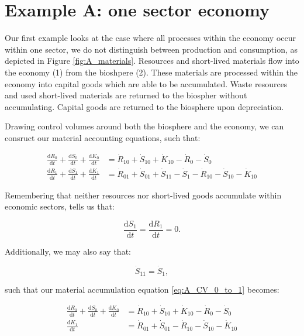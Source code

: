 \section{Example A: one sector economy}
\label{sec:A_materials}


Our first example looks at the case where all processes within the economy occur within
one sector, we do not distinguish between production and consumption, as depicted in
Figure \ref{fig:A_materials}. Resources and short-lived materials flow into the economy (1) from the bioshpere (2). These materials are processed within the economy into
capital goods which are able to be accumulated. Waste resources and used short-lived
materials are returned to the biospher without accumulating. Capital goods are returned
to the biosphere upon depreciation.

Drawing control volumes around both the biosphere and the economy, we can consruct
our material accounting equations, such that:

\begin{align}\label{eq:A_CV_0_to_1}
	\frac{\mathrm{d}R_0}{\mathrm{d}t}		
	+	\frac{\mathrm{d}S_0}{\mathrm{d}t}
	+	\frac{\mathrm{d}K_0}{\mathrm{d}t}		&	
	=	\dot{R}_{10}		
	+	\dot{S}_{10}	
	+	\dot{K}_{10}											
	-	\dot{R}_{0}											
	-	\dot{S}_{0}								\\
	\frac{\mathrm{d}R_{1}}{\mathrm{d}t}
	+ \frac{\mathrm{d}S_{1}}{\mathrm{d}t}
	+ \frac{\mathrm{d}K_{1}}{\mathrm{d}t}		&
	= \dot{R}_{01} 
	+ \dot{S}_{01} + \dot{S}_{11}
	- \dot{S}_{1}				
	- \dot{R}_{10}				
	- \dot{S}_{10}				
	- \dot{K}_{10}											
\end{align}

\noindent Remembering that neither resources nor short-lived goods accumulate within economic sectors, tells us that:

\begin{equation}\label{eq:A-dS_1/dt_zero}
	\frac{\mathrm{d}S_1}{\mathrm{d}t}
	= \frac{\mathrm{d}R_1}{\mathrm{d}t}
	= 0.
\end{equation}

\noindent Additionally, we may also say that:

\begin{equation}\label{eq:A_S11}
	\dot{S}_{11} = \dot{S}_{1},
\end{equation}

\noindent such that our material accumulation equation \ref{eq:A_CV_0_to_1} becomes:

\begin{align}\label{eq:A_CV_0_to_1_b}
	\frac{\mathrm{d}R_0}{\mathrm{d}t}		
	+	\frac{\mathrm{d}S_0}{\mathrm{d}t}
	+	\frac{\mathrm{d}K_0}{\mathrm{d}t}		&	
	=	\dot{R}_{10}		
	+	\dot{S}_{10}	
	+	\dot{K}_{10}											
	-	\dot{R}_{0}											
	-	\dot{S}_{0}								\\
	\frac{\mathrm{d}K_{1}}{\mathrm{d}t}		&
	= \dot{R}_{01} 
	+ \dot{S}_{01} 
	- \dot{R}_{10}				
	- \dot{S}_{10}				
	- \dot{K}_{10}											
\end{align}

